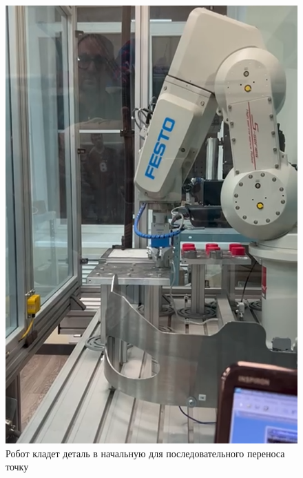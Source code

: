 \documentclass[a4paper, 12pt]{article}
\begin{document}
    \begin{figure}[H]
        \centering
        \includegraphics[scale=1]{put00.png}
        \captionsetup{skip=0pt}
        \caption{Робот кладет деталь в начальную для последовательного переноса точку}
        \label{fig:put00}
    \end{figure}
\end{document}
